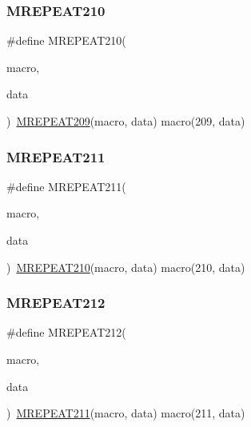 \mbox{\label{group__group__sam0__utils__mrepeat_ga888280894db1adc77f3524c72d226bc3}} 
\subsubsection{\texorpdfstring{MREPEAT210}{MREPEAT210}}
{\footnotesize\ttfamily \#define M\+R\+E\+P\+E\+A\+T210(\begin{DoxyParamCaption}\item[{}]{macro,  }\item[{}]{data }\end{DoxyParamCaption})~\mbox{\hyperlink{group__group__sam0__utils__mrepeat_ga6febba153ad3a3ea0ddd84b95ddded40}{M\+R\+E\+P\+E\+A\+T209}}(macro, data)   macro(209, data)}

\mbox{\label{group__group__sam0__utils__mrepeat_ga9b4e3f709d79be3abf426a6f35373a9f}} 
\subsubsection{\texorpdfstring{MREPEAT211}{MREPEAT211}}
{\footnotesize\ttfamily \#define M\+R\+E\+P\+E\+A\+T211(\begin{DoxyParamCaption}\item[{}]{macro,  }\item[{}]{data }\end{DoxyParamCaption})~\mbox{\hyperlink{group__group__sam0__utils__mrepeat_ga888280894db1adc77f3524c72d226bc3}{M\+R\+E\+P\+E\+A\+T210}}(macro, data)   macro(210, data)}

\mbox{\label{group__group__sam0__utils__mrepeat_gad82f46aaf9a5b824c91394754824d66d}} 
\subsubsection{\texorpdfstring{MREPEAT212}{MREPEAT212}}
{\footnotesize\ttfamily \#define M\+R\+E\+P\+E\+A\+T212(\begin{DoxyParamCaption}\item[{}]{macro,  }\item[{}]{data }\end{DoxyParamCaption})~\mbox{\hyperlink{group__group__sam0__utils__mrepeat_ga9b4e3f709d79be3abf426a6f35373a9f}{M\+R\+E\+P\+E\+A\+T211}}(macro, data)   macro(211, data)}


